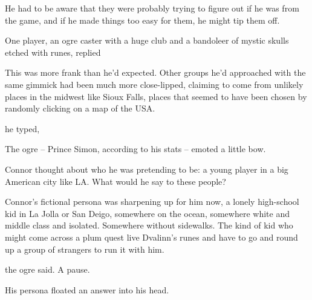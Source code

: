 
He had to be aware that they were probably trying to figure out if
he was from the game, and if he made things too easy for them, he
might tip them off.

One player, an ogre caster with a huge club and a bandoleer of
mystic skulls etched with runes, replied


This was more frank than he'd expected. Other groups he'd
approached with the same gimmick had been much more close-lipped,
claiming to come from unlikely places in the midwest like Sioux
Falls, places that seemed to have been chosen by randomly clicking
on a map of the USA.


he typed,


The ogre -- Prince Simon, according to his stats -- emoted a little
bow.


Connor thought about who he was pretending to be: a young player in
a big American city like LA. What would he say to these people?




Connor's fictional persona was sharpening up for him now, a lonely
high-school kid in La Jolla or San Deigo, somewhere on the ocean,
somewhere white and middle class and isolated. Somewhere without
sidewalks. The kind of kid who might come across a plum quest live
Dvalinn's runes and have to go and round up a group of strangers to
run it with him.


the ogre said. A pause.


His persona floated an answer into his head.


